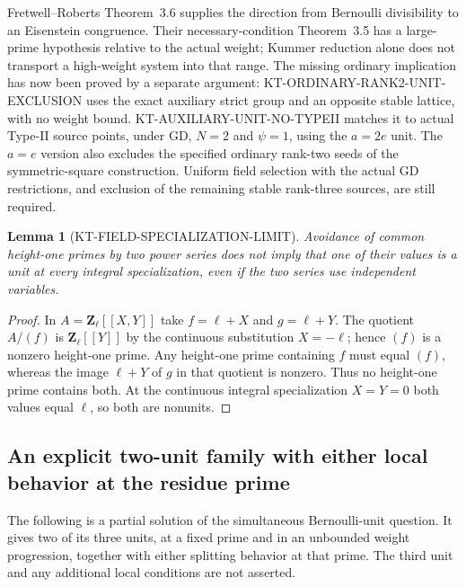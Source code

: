 \documentclass[11pt,a4paper]{article}
\newtheorem{lemma}[theorem]{Lemma}
\theoremstyle{definition}
\begin{document}
Fretwell--Roberts Theorem~3.6 supplies the direction from
Bernoulli divisibility to an Eisenstein congruence. Their
necessary-condition Theorem~3.5 has a large-prime hypothesis
relative to the actual weight; Kummer reduction alone does not
transport a high-weight system into that range. The missing
ordinary implication has now been proved by a separate argument:
KT-ORDINARY-RANK2-UNIT-EXCLUSION uses the exact auxiliary strict
group and an opposite stable lattice, with no weight bound.
KT-AUXILIARY-UNIT-NO-TYPEII matches it to actual Type-II source
points, under GD, $N=2$ and $\psi=1$, using the $a=2e$ unit.
The $a=e$ version also excludes the specified ordinary rank-two
seeds of the symmetric-square construction. Uniform field
selection with the actual GD restrictions, and exclusion of
the remaining stable rank-three sources, are still required.

\begin{lemma}[KT-FIELD-SPECIALIZATION-LIMIT]
Avoidance of common height-one primes by two power series does
not imply that one of their values is a unit at every integral
specialization, even if the two series use independent variables.
\end{lemma}
\begin{proof}
In $A=\mathbf Z_\ell[[X,Y]]$ take $f=\ell+X$ and $g=\ell+Y$.
The quotient $A/(f)$ is $\mathbf Z_\ell[[Y]]$ by the continuous
substitution $X=-\ell$; hence $(f)$ is a nonzero height-one
prime. Any height-one prime containing $f$ must equal $(f)$,
whereas the image $\ell+Y$ of $g$ in that quotient is nonzero.
Thus no height-one prime contains both. At the continuous
integral specialization $X=Y=0$ both values equal $\ell$,
so both are nonunits.
\end{proof}



\subsection{An explicit two-unit family with either local behavior at the residue prime}
\label{sec:kt-explicit-two-unit}

The following is a partial solution of the simultaneous Bernoulli-unit
question.  It gives two of its three units, at a fixed prime and in an
unbounded weight progression, together with either splitting behavior at
that prime.  The third unit and any additional local conditions are not
asserted.
\end{document}
